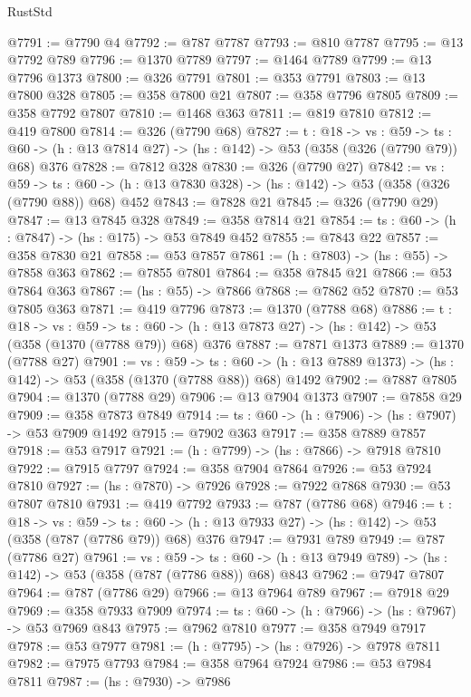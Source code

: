 \begin{lexlean}{RustStd}
\begin{coremodule}
@7791 := @7790 @4
@7792 := @787 @7787
@7793 := @810 @7787
@7795 := @13 @7792 @789
@7796 := @1370 @7789
@7797 := @1464 @7789
@7799 := @13 @7796 @1373
@7800 := @326 @7791
@7801 := @353 @7791
@7803 := @13 @7800 @328
@7805 := @358 @7800 @21
@7807 := @358 @7796 @7805
@7809 := @358 @7792 @7807
@7810 := @1468 @363
@7811 := @819 @7810
@7812 := @419 @7800
@7814 := @326 (@7790 @68)
@7827 := {t : @18} ->
  {vs : @59} ->
  {ts : @60} -> (h : @13 @7814 @27) -> (hs : @142) -> @53 (@358 (@326 (@7790 @79)) @68) @376
@7828 := @7812 @328
@7830 := @326 (@7790 @27)
@7842 := {vs : @59} ->
  {ts : @60} -> (h : @13 @7830 @328) -> (hs : @142) -> @53 (@358 (@326 (@7790 @88)) @68) @452
@7843 := @7828 @21
@7845 := @326 (@7790 @29)
@7847 := @13 @7845 @328
@7849 := @358 @7814 @21
@7854 := {ts : @60} -> (h : @7847) -> (hs : @175) -> @53 @7849 @452
@7855 := @7843 @22
@7857 := @358 @7830 @21
@7858 := @53 @7857
@7861 := (h : @7803) -> (hs : @55) -> @7858 @363
@7862 := @7855 @7801
@7864 := @358 @7845 @21
@7866 := @53 @7864 @363
@7867 := (hs : @55) -> @7866
@7868 := @7862 @52
@7870 := @53 @7805 @363
@7871 := @419 @7796
@7873 := @1370 (@7788 @68)
@7886 := {t : @18} ->
  {vs : @59} ->
  {ts : @60} -> (h : @13 @7873 @27) -> (hs : @142) -> @53 (@358 (@1370 (@7788 @79)) @68) @376
@7887 := @7871 @1373
@7889 := @1370 (@7788 @27)
@7901 := {vs : @59} ->
  {ts : @60} -> (h : @13 @7889 @1373) -> (hs : @142) -> @53 (@358 (@1370 (@7788 @88)) @68) @1492
@7902 := @7887 @7805
@7904 := @1370 (@7788 @29)
@7906 := @13 @7904 @1373
@7907 := @7858 @29
@7909 := @358 @7873 @7849
@7914 := {ts : @60} -> (h : @7906) -> (hs : @7907) -> @53 @7909 @1492
@7915 := @7902 @363
@7917 := @358 @7889 @7857
@7918 := @53 @7917
@7921 := (h : @7799) -> (hs : @7866) -> @7918 @7810
@7922 := @7915 @7797
@7924 := @358 @7904 @7864
@7926 := @53 @7924 @7810
@7927 := (hs : @7870) -> @7926
@7928 := @7922 @7868
@7930 := @53 @7807 @7810
@7931 := @419 @7792
@7933 := @787 (@7786 @68)
@7946 := {t : @18} ->
  {vs : @59} ->
  {ts : @60} -> (h : @13 @7933 @27) -> (hs : @142) -> @53 (@358 (@787 (@7786 @79)) @68) @376
@7947 := @7931 @789
@7949 := @787 (@7786 @27)
@7961 := {vs : @59} ->
  {ts : @60} -> (h : @13 @7949 @789) -> (hs : @142) -> @53 (@358 (@787 (@7786 @88)) @68) @843
@7962 := @7947 @7807
@7964 := @787 (@7786 @29)
@7966 := @13 @7964 @789
@7967 := @7918 @29
@7969 := @358 @7933 @7909
@7974 := {ts : @60} -> (h : @7966) -> (hs : @7967) -> @53 @7969 @843
@7975 := @7962 @7810
@7977 := @358 @7949 @7917
@7978 := @53 @7977
@7981 := (h : @7795) -> (hs : @7926) -> @7978 @7811
@7982 := @7975 @7793
@7984 := @358 @7964 @7924
@7986 := @53 @7984 @7811
@7987 := (hs : @7930) -> @7986

\end{coremodule}
\end{lexlean}
